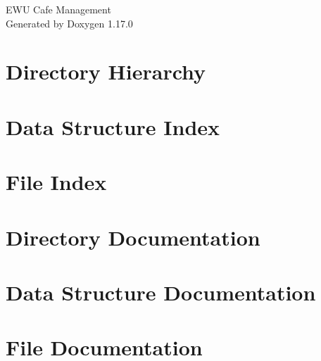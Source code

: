 \documentclass[twoside]{book}
\newcommand{\+}{\discretionary{\mbox{\scriptsize$\hookleftarrow$}}{}{}}
\newcommand{\clearemptydoublepage}{%
    \newpage{\pagestyle{empty}\cleardoublepage}%
  }
\begin{document}
  \raggedbottom
    \hypersetup{pageanchor=false,
                bookmarksnumbered=true,
                pdfencoding=unicode
               }
  \begin{titlepage}
  \vspace*{7cm}
  \begin{center}%
  {\Large EWU Cafe Management}\\
  \vspace*{1cm}
  {\large Generated by Doxygen 1.17.0}\\
  \end{center}
  \end{titlepage}
  \clearemptydoublepage
  \tableofcontents
  \clearemptydoublepage
  \hypersetup{pageanchor=true}
\chapter{Directory Hierarchy}

\chapter{Data Structure Index}

\chapter{File Index}

\chapter{Directory Documentation}

\chapter{Data Structure Documentation}


\chapter{File Documentation}







  \backmatter
  \newpage
  \clearemptydoublepage
  \printindex
\end{document}
